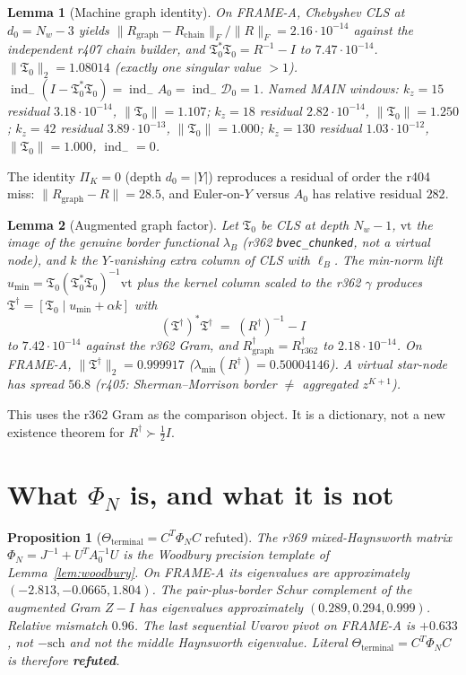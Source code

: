 \documentclass[11pt]{article}
\newtheorem{lemma}{Lemma}
\newtheorem{prop}{Proposition}
\theoremstyle{remark}
\newcommand{\indm}{\operatorname{ind}_{-}}
\newcommand{\half}{\tfrac12}
\newcommand{\Tfrak}{\mathfrak{T}}
\newcommand{\cD}{\mathcal{D}}
\begin{document}
\begin{lemma}[Machine graph identity]\label{lem:graph}
On FRAME-A, Chebyshev CLS at $d_0=N_w-3$ yields
$\|R_{\mathrm{graph}}-R_{\mathrm{chain}}\|_F/\|R\|_F
=2.16\cdot 10^{-14}$ against the independent r407 chain
builder, and
$\Tfrak_0^*\Tfrak_0=R^{-1}-I$ to $7.47\cdot 10^{-14}$.
$\|\Tfrak_0\|_2=1.08014$ (exactly one singular value $>1$).
$\indm(I-\Tfrak_0^*\Tfrak_0)=\indm A_0=\indm\cD_0=1$.
Named MAIN windows: $k_z=15$ residual $3.18\cdot 10^{-14}$,
$\|\Tfrak_0\|=1.107$; $k_z=18$ residual $2.82\cdot 10^{-14}$,
$\|\Tfrak_0\|=1.250$; $k_z=42$ residual $3.89\cdot 10^{-13}$,
$\|\Tfrak_0\|=1.000$; $k_z=130$ residual $1.03\cdot 10^{-12}$,
$\|\Tfrak_0\|=1.000$, $\indm=0$.
\end{lemma}

The identity $\Pi_K=0$ (depth $d_0=|Y|$) reproduces a residual
of order the r404 miss: $\|R_{\mathrm{graph}}-R\|=28.5$, and
Euler-on-$Y$ versus $A_0$ has relative residual $282$.

\begin{lemma}[Augmented graph factor]\label{lem:tdag}
Let $\Tfrak_0$ be CLS at depth $N_w-1$, $\mathrm{vt}$ the image
of the genuine border functional $\lambda_B$ (r362
\texttt{bvec\_chunked}, not a virtual node), and $k$ the
$Y$-vanishing extra column of CLS with $\ell_B$.
The min-norm lift $u_{\min}=\Tfrak_0(\Tfrak_0^*\Tfrak_0)^{-1}\mathrm{vt}$
plus the kernel column scaled to the r362 $\gamma$ produces
$\Tfrak^\dagger=[\Tfrak_0\mid u_{\min}+\alpha k]$ with
\[
  (\Tfrak^\dagger)^*\Tfrak^\dagger
  \;=\;
  (R^\dagger)^{-1}-I
\]
to $7.42\cdot 10^{-14}$ against the r362 Gram, and
$R^\dagger_{\mathrm{graph}}=R^\dagger_{\mathrm{r362}}$ to
$2.18\cdot 10^{-14}$.
On FRAME-A, $\|\Tfrak^\dagger\|_2=0.999917$
($\lambda_{\min}(R^\dagger)=0.50004146$).
A virtual star-node has spread $56.8$ (r405: Sherman--Morrison
border $\neq$ aggregated $z^{K+1}$).
\end{lemma}

This uses the r362 Gram as the comparison object.
It is a dictionary, not a new existence theorem for
$R^\dagger\succ\half I$.

\section{What $\Phi_N$ is, and what it is not}\label{sec:phi}

\begin{prop}[$\Theta_{\mathrm{terminal}}=C^T\Phi_N C$ refuted]
\label{prop:phi}
The r369 mixed-Haynsworth matrix
$\Phi_N=J^{-1}+U^TA_0^{-1}U$ is the Woodbury precision
template of Lemma~\ref{lem:woodbury}.
On FRAME-A its eigenvalues are approximately
$(-2.813,-0.0665,1.804)$.
The pair-plus-border Schur complement of the augmented Gram
$Z-I$ has eigenvalues approximately
$(0.289,0.294,0.999)$.
Relative mismatch $0.96$.
The last sequential Uvarov pivot on FRAME-A is $+0.633$, not
$-\mathrm{sch}$ and not the middle Haynsworth eigenvalue.
Literal $\Theta_{\mathrm{terminal}}=C^T\Phi_N C$ is therefore
\textbf{refuted}.
\end{prop}
\end{document}
